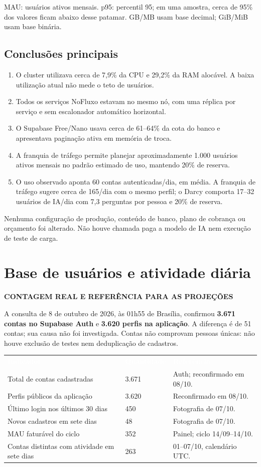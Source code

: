 \documentclass[10pt,a4paper]{article}
\newcommand{\smallnote}[1]{\par{\footnotesize\color{NFMuted}#1\par}}
\newcommand{\headcell}[1]{\textcolor{white}{\bfseries #1}}
\newcommand{\pagechapter}[1]{\clearpage\section{#1}}
\newcommand{\tagline}[1]{{\footnotesize\bfseries\color{NFPrimary}#1\par}\vspace{3mm}}
\begin{document}
\smallnote{MAU: usuários ativos mensais. p95: percentil 95; em uma amostra, cerca de 95\% dos valores ficam abaixo desse patamar. GB/MB usam base decimal; GiB/MiB usam base binária.}

\subsection{Conclusões principais}
\begin{enumerate}
\item O cluster utilizava cerca de 7,9\% da CPU e 29,2\% da RAM alocável. A baixa utilização atual não mede o teto de usuários.
\item Todos os serviços NoFluxo estavam no mesmo nó, com uma réplica por serviço e sem escalonador automático horizontal.
\item O Supabase Free/Nano usava cerca de 61–64\% da cota do banco e apresentava paginação ativa em memória de troca.
\item A franquia de tráfego permite planejar aproximadamente 1.000 usuários ativos mensais no padrão estimado de uso, mantendo 20\% de reserva.
\item O uso observado aponta 60 contas autenticadas/dia, em média. A franquia de tráfego sugere cerca de 165/dia com o mesmo perfil; o Darcy comporta 17–32 usuários de IA/dia com 7,3 perguntas por pessoa e 20\% de reserva.
\end{enumerate}
\smallnote{Nenhuma configuração de produção, conteúdo de banco, plano de cobrança ou orçamento foi alterado. Não houve chamada paga a modelo de IA nem execução de teste de carga.}

\pagechapter{Base de usuários e atividade diária}
\tagline{CONTAGEM REAL E REFERÊNCIA PARA AS PROJEÇÕES}
A consulta de 8 de outubro de 2026, às 01h55 de Brasília, confirmou \textbf{3.671 contas no Supabase Auth} e \textbf{3.620 perfis na aplicação}. A diferença é de 51 contas; sua causa não foi investigada. Contas não comprovam pessoas únicas: não houve exclusão de testes nem deduplicação de cadastros.

\begingroup\small\renewcommand{\arraystretch}{1.22}
\par\noindent\begin{tabularx}{\linewidth}{@{}Y R{24mm}L{47mm}@{}}
\headcell{Indicador}&\headcell{Quantidade}&\headcell{Referência}\\
Total de contas cadastradas&3.671&Auth; reconfirmado em 08/10.\\
Perfis públicos da aplicação&3.620&Reconfirmado em 08/10.\\
Último login nos últimos 30 dias&450&Fotografia de 07/10.\\
Novos cadastros em sete dias&48&Fotografia de 07/10.\\
MAU faturável do ciclo&352&Painel; ciclo 14/09–14/10.\\
Contas distintas com atividade em sete dias&263&01–07/10, calendário UTC.\\
\end{tabularx}\endgroup
\end{document}
